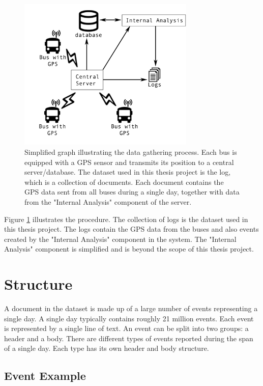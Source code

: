 \begin{figure}
    \centering
    \includegraphics[width=0.75\textwidth]{figures/data-gathering}
    \caption{Simplified graph illustrating the data gathering process. Each bus is equipped with a GPS sensor and transmits its position to a central server/database.
    The dataset used in this thesis project is the log, which is a collection of documents.
    Each document contains the GPS data sent from all buses during a single day, together with data from the "Internal Analysis" component of the server.}
    \label{fig:data-gathering}
\end{figure}

Figure \ref{fig:data-gathering} illustrates the procedure.
The collection of logs is the dataset used in this thesis project.
The logs contain the GPS data from the buses and also events created by the "Internal Analysis" component in the system.
The "Internal Analysis" component is simplified and is beyond the scope of this thesis project.

\section{Structure}
A document in the dataset is made up of a large number of events representing a single day.
A single day typically contains roughly 21  million events.  
Each event is represented by a single line of text.
An event can be split into two groups: a header and a body.
There are different types of events reported during the span of a single day.
Each type has its own header and body structure.

\subsection{Event Example}

